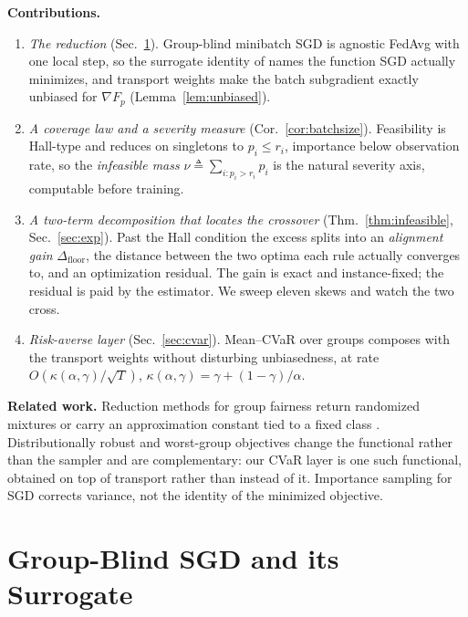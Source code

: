 \documentclass{article}
\theoremstyle{definition}
\begin{document}
\noindent\textbf{Contributions.}
\begin{enumerate}\itemsep0pt\parskip0pt
\item \emph{The reduction} (Sec.~\ref{sec:setup}). Group-blind minibatch SGD is
agnostic \textsf{FedAvg} with one local step, so the surrogate identity of
\cite{rahimi2025agnostic} names the function SGD actually minimizes, and
transport weights make the batch subgradient exactly unbiased for $\nabla F_p$
(Lemma~\ref{lem:unbiased}).
\item \emph{A coverage law and a severity measure} (Cor.~\ref{cor:batchsize}).
Feasibility is Hall-type and reduces on singletons to $p_i\le r_i$, importance
below observation rate, so the \emph{infeasible mass}
$\nu\triangleq\sum_{i:p_i>r_i}p_i$ is the natural severity axis, computable
before training.
\item \emph{A two-term decomposition that locates the crossover}
(Thm.~\ref{thm:infeasible}, Sec.~\ref{sec:exp}). Past the Hall condition the
excess splits into an \emph{alignment gain} $\Delta_{\mathrm{floor}}$, the
distance between the two optima each rule actually converges to, and an
optimization residual. The gain is exact and instance-fixed; the residual is
paid by the estimator. We sweep eleven skews and watch the two cross.
\item \emph{Risk-averse layer} (Sec.~\ref{sec:cvar}). Mean--CVaR over groups
composes with the transport weights without disturbing unbiasedness, at rate
$O(\kappa(\alpha,\gamma)/\sqrt{T})$,
$\kappa(\alpha,\gamma)=\gamma+(1-\gamma)/\alpha$.
\end{enumerate}

\noindent\textbf{Related work.}
Reduction methods for group fairness return randomized mixtures or carry an
approximation constant tied to a fixed class
\cite{agarwal2018reductions,cotter2019twoplayer,chamon2020pacc}.
Distributionally robust and worst-group objectives
\cite{sagawa2020dro,hashimoto2018repeated,levy2020large} change the functional
rather than the sampler and are complementary: our CVaR layer is one such
functional, obtained on top of transport rather than instead of it. Importance
sampling for SGD \cite{rizk2021importance,katharopoulos2018not} corrects
variance, not the identity of the minimized objective.

\section{Group-Blind SGD and its Surrogate}
\label{sec:setup}
\end{document}
